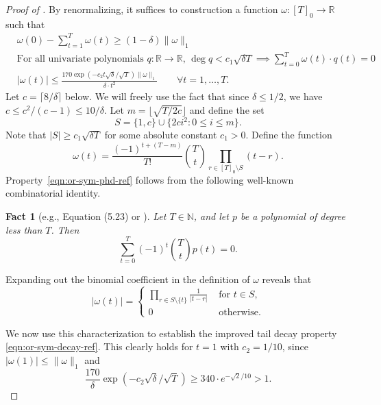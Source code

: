 \documentclass[11pt, letterpaper, fleqn]{article}
\newtheorem{fact}[theorem]{Fact}
\theoremstyle{plain}
\newcommand{\R}{\mathbb{R}}
\newcommand{\N}{\mathbb{N}}
\begin{document}
\begin{proof}[Proof of ]
By renormalizing, it suffices to construction a function $\omega : [T]_0 \to \R$ such that
\begin{align} &\omega(0) - \sum_{t = 1}^T \omega(t) \ge (1 - \delta)\|\omega\|_1  \label{eqn:or-sym-corr-ref}\\
& \text{For all univariate polynomials } q \colon \R \to \R\text{, } \deg q < c_1\sqrt{\delta T} \implies \sum_{t=0}^T \omega(t) \cdot q(t) = 0 \label{eqn:or-sym-phd-ref}\\
& |\omega(t)| \le \frac{170 \exp(-c_2 t \sqrt{\delta} /\sqrt{T})\|\omega\|_1}{\delta \cdot t^2} \qquad \forall t = 1, \dots, T.\label{eqn:or-sym-decay-ref}\end{align}
 Let $c = \lceil 8 / \delta \rceil$ below. We will freely use the fact that since $\delta \le 1/2$, we have $c \le c^2 / (c-1) \le 10 /\delta$. Let $m = \lfloor \sqrt{T/2c} \rfloor$ and define the set
\[S = \{1, c\} \cup \{2ci^2 : 0 \le i \le m\}.\]
Note that $|S| \ge  c_1 \sqrt{\delta T}$ for some absolute constant $c_1 > 0$. Define the function
\[\omega(t) = \frac{(-1)^{t+(T-m)}}{T!} \binom{T}{t} \prod_{r \in [T]_0 \setminus S} (t - r).\]
Property~\eqref{eqn:or-sym-phd-ref} follows from the following well-known combinatorial identity.
\begin{fact}[e.g., \cite{concrete} Equation (5.23) or \cite{osnewbounds}] \label{fact:combinatorial}
Let $T \in \N$, and let $p$ be a polynomial of degree less than $T$. Then
\[\sum_{t = 0}^T (-1)^t \binom{T}{t} p(t) = 0.\]
\end{fact}

Expanding out the binomial coefficient in the definition of $\omega$ reveals that
\[|\omega(t)| = \begin{cases}
 \prod\limits_{r \in S \setminus \{t\}} \frac{1}{|t - r|} & \text{ for } t \in S, \\
0 & \text{ otherwise.}
\end{cases}\]

We now use this characterization to establish the improved tail decay property \eqref{eqn:or-sym-decay-ref}. This clearly holds for $t = 1$ with $c_2 = 1/10$, since $|\omega(1)| \le \|\omega\|_1$ and
\[\frac{170}{\delta} \exp(-c_2\sqrt{\delta} / \sqrt{T}) \ge 340 \cdot e^{-\sqrt{2} / 10} > 1.\]


\end{proof}
\end{document}
